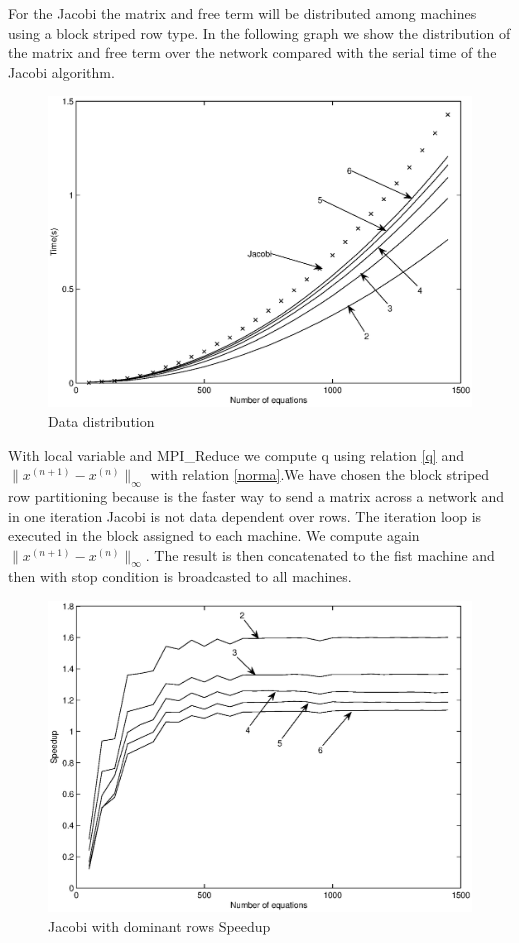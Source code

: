 \documentclass[times,10pt,twocolumn]{article}
\begin{document}
For the Jacobi the matrix and free term will be distributed among
 machines using a block striped row type. In the following graph we show
 the distribution of the matrix and free term over the network 
compared with the serial time of the Jacobi algorithm.

\begin{figure}[h]
   \includegraphics[scale=0.44]{distrib-mpich2-bw.eps}
   \caption{Data distribution}
\end{figure}

With local variable and MPI\_Reduce we compute q using relation \ref{q} and 
$\|x^{(n+1)}-x^{(n)}\|_\infty$  with relation \ref{norma}.We have chosen the block striped row partitioning 
because is the faster way to send a matrix across a network and in one 
iteration Jacobi is not data dependent over rows.
The iteration loop is executed in the block assigned to each machine. 
We compute again $\|x^{(n+1)}-x^{(n)}\|_\infty$.
The result is then concatenated to the fist machine and then with stop condition is broadcasted to 
all machines.

\begin{figure}[h]
   \includegraphics[scale=0.44]{jr-mpich2-bw.eps}
   \caption{Jacobi with dominant rows Speedup}
\end{figure}
\end{document}
